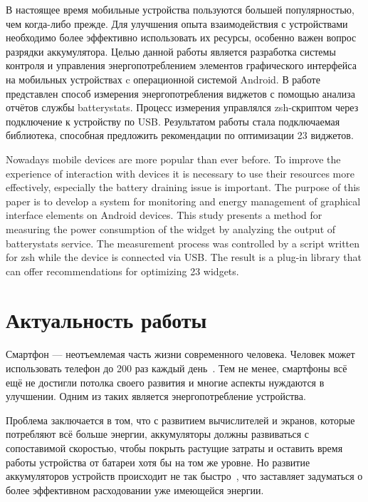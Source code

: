 \documentclass[a4paper,14pt]{extarticle} %
\begin{document}
	
	
	
	
	
	В настоящее время мобильные устройства пользуются большей популярностью, чем когда-либо прежде. Для улучшения опыта взаимодействия с устройствами необходимо более эффективно использовать их ресурсы, особенно важен вопрос разрядки аккумулятора. Целью данной работы является разработка системы контроля и управления энергопотреблением элементов графического интерфейса на мобильных устройствах c операционной системой Android. В работе представлен способ измерения энергопотребления виджетов с помощью анализа отчётов службы batterystats. Процесс измерения управлялся zsh-скриптом через подключение к устройству по USB. Результатом работы стала подключаемая библиотека, способная предложить рекомендации по оптимизации 23 виджетов.
	
	
	Nowadays mobile devices are more popular than ever before. To improve the experience of interaction with devices it is necessary to use their resources more effectively, especially the battery draining issue is important. The purpose of this paper is to develop a system for monitoring and energy management of graphical interface elements on Android devices. This study presents a method for measuring the power consumption of the widget by analyzing the output of batterystats service. The measurement process was controlled by a script written for zsh while the device is connected via USB. The result is a plug-in library that can offer recommendations for optimizing 23 widgets.
	
	\newpage
	\tableofcontents
	\newpage
	
	
	
	\newpage
	\section{Актуальность работы}
	
	Смартфон --- неотъемлемая часть жизни современного человека. Человек может использовать телефон до 200 раз каждый день~\parencite{falaki2010diversity}. Тем не менее, смартфоны всё ещё не достигли потолка своего развития и многие аспекты нуждаются в улучшении. Одним из таких является энергопотребление устройства.
	
	Проблема заключается в том, что с развитием вычислителей и экранов, которые потребляют всё больше энергии, аккумуляторы должны развиваться с сопоставимой скоростью, чтобы покрыть растущие затраты и оставить время работы устройства от батареи хотя бы на том же уровне. Но развитие аккумуляторов устройств происходит не так быстро~\parencite{pentikousis2010search}, что заставляет задуматься о более эффективном расходовании уже имеющейся энергии.
	
\end{document}
